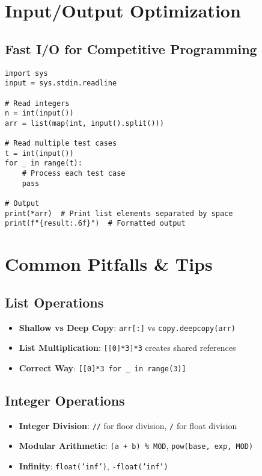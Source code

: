 \section{Input/Output Optimization}

\subsection{Fast I/O for Competitive Programming}
\begin{verbatim}
import sys
input = sys.stdin.readline

# Read integers
n = int(input())
arr = list(map(int, input().split()))

# Read multiple test cases
t = int(input())
for _ in range(t):
    # Process each test case
    pass

# Output
print(*arr)  # Print list elements separated by space
print(f"{result:.6f}")  # Formatted output
\end{verbatim}

\section{Common Pitfalls \& Tips}

\subsection{List Operations}
\begin{itemize}
    \item \textbf{Shallow vs Deep Copy}: \texttt{arr[:]} vs \texttt{copy.deepcopy(arr)}
    \item \textbf{List Multiplication}: \texttt{[[0]*3]*3} creates shared references
    \item \textbf{Correct Way}: \texttt{[[0]*3 for \_ in range(3)]}
\end{itemize}

\subsection{Integer Operations}
\begin{itemize}
    \item \textbf{Integer Division}: \texttt{//} for floor division, \texttt{/} for float division
    \item \textbf{Modular Arithmetic}: \texttt{(a + b) \% MOD}, \texttt{pow(base, exp, MOD)}
    \item \textbf{Infinity}: \texttt{float('inf')}, \texttt{-float('inf')}
\end{itemize}


